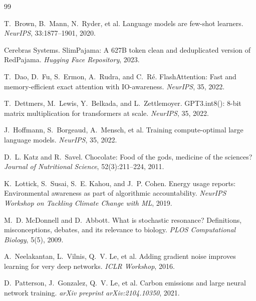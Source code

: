 \documentclass[11pt,a4paper]{article}
\begin{document}

\begin{thebibliography}{99}

T.~Brown, B.~Mann, N.~Ryder, et al.
\newblock Language models are few-shot learners.
\newblock \emph{NeurIPS}, 33:1877--1901, 2020.

Cerebras Systems.
\newblock SlimPajama: A 627B token clean and deduplicated version of RedPajama.
\newblock \emph{Hugging Face Repository}, 2023.

T.~Dao, D.~Fu, S.~Ermon, A.~Rudra, and C.~Ré.
\newblock FlashAttention: Fast and memory-efficient exact attention with IO-awareness.
\newblock \emph{NeurIPS}, 35, 2022.

T.~Dettmers, M.~Lewis, Y.~Belkada, and L.~Zettlemoyer.
\newblock GPT3.int8(): 8-bit matrix multiplication for transformers at scale.
\newblock \emph{NeurIPS}, 35, 2022.

J.~Hoffmann, S.~Borgeaud, A.~Mensch, et al.
\newblock Training compute-optimal large language models.
\newblock \emph{NeurIPS}, 35, 2022.

D.~L. Katz and R.~Savel.
\newblock Chocolate: Food of the gods, medicine of the sciences?
\newblock \emph{Journal of Nutritional Science}, 52(3):211--224, 2011.

K.~Lottick, S.~Susai, S.~E. Kahou, and J.~P. Cohen.
\newblock Energy usage reports: Environmental awareness as part of algorithmic accountability.
\newblock \emph{NeurIPS Workshop on Tackling Climate Change with ML}, 2019.

M.~D. McDonnell and D.~Abbott.
\newblock What is stochastic resonance? Definitions, misconceptions, debates, and its relevance to biology.
\newblock \emph{PLOS Computational Biology}, 5(5), 2009.

A.~Neelakantan, L.~Vilnis, Q.~V. Le, et al.
\newblock Adding gradient noise improves learning for very deep networks.
\newblock \emph{ICLR Workshop}, 2016.

D.~Patterson, J.~Gonzalez, Q.~V. Le, et al.
\newblock Carbon emissions and large neural network training.
\newblock \emph{arXiv preprint arXiv:2104.10350}, 2021.


\end{thebibliography}
\end{document}

